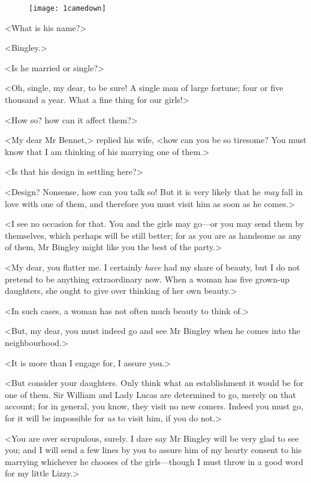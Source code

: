 \begin{figure}[tbh]
\centering
\texttt{[image: 1camedown]}
\end{figure}

<What is his name?>

<Bingley.>

<Is he married or single?>

<Oh, single, my dear, to be sure! A single man of large fortune; four or five thousand a year. What a fine thing for our girls!>

<How so? how can it affect them?>

<My dear Mr Bennet,> replied his wife, <how can you be so tiresome? You must know that I am thinking of his marrying one of them.>

<Is that his design in settling here?>

<Design? Nonsense, how can you talk so! But it is very likely that he \textit{may} fall in love with one of them, and therefore you must visit him as soon as he comes.>

<I see no occasion for that. You and the girls may go—or you may send them by themselves, which perhaps will be still better; for as you are as handsome as any of them, Mr Bingley might like you the best of the party.>

<My dear, you flatter me. I certainly \textit{have} had my share of beauty, but I do not pretend to be anything extraordinary now. When a woman has five grown-up daughters, she ought to give over thinking of her own beauty.>

<In such cases, a woman has not often much beauty to think of.>

<But, my dear, you must indeed go and see Mr Bingley when he comes into the neighbourhood.>

<It is more than I engage for, I assure you.>

<But consider your daughters. Only think what an establishment it would be for one of them. Sir William and Lady Lucas are determined to go, merely on that account; for in general, you know, they visit no new comers. Indeed you must go, for it will be impossible for \textit{us} to visit him, if you do not.>

<You are over scrupulous, surely. I dare say Mr Bingley will be very glad to see you; and I will send a few lines by you to assure him of my hearty consent to his marrying whichever he chooses of the girls—though I must throw in a good word for my little Lizzy.>

